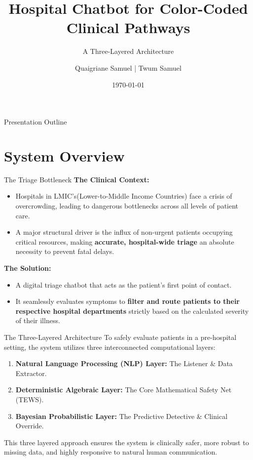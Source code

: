 \documentclass[11pt, aspectratio=169]{beamer}
\title[Hospital Chatbot for Clinical Pathways]{Hospital Chatbot for Color-Coded Clinical Pathways}
\subtitle{A Three-Layered Architecture}
\author{Quaigriane Samuel | Twum Samuel}
\date{\today}
\begin{document}
	
	\begin{frame}
		\titlepage
	\end{frame}
	
	\begin{frame}{Presentation Outline}
		\tableofcontents
	\end{frame}
	
\section{System Overview}
\begin{frame}{The Triage Bottleneck}
	\textbf{The Clinical Context:}
	\begin{itemize}
		\item Hospitals in LMIC's(Lower-to-Middle Income Countries) face a crisis of overcrowding, leading to dangerous bottlenecks across all levels of patient care.
		\item A major structural driver is the influx of non-urgent patients occupying critical resources, making \textbf{accurate, hospital-wide triage} an absolute necessity to prevent fatal delays.
	\end{itemize}
	\vspace{0.2cm}
	\textbf{The Solution:}
	\begin{itemize}
		\item A digital triage chatbot that acts as the patient's first point of contact. 
		\item It seamlessly evaluates symptoms to \textbf{filter and route patients to their respective hospital departments} strictly based on the calculated severity of their illness.
	\end{itemize}
\end{frame}
	
	\begin{frame}{The Three-Layered Architecture}
		To safely evaluate patients in a pre-hospital setting, the system utilizes three interconnected computational layers:
		\vspace{0.3cm}
		\begin{enumerate}
			\item \textbf{Natural Language Processing (NLP) Layer:} The Listener \& Data Extractor.
			\item \textbf{Deterministic Algebraic Layer:} The Core Mathematical Safety Net (TEWS).
			\item \textbf{Bayesian Probabilistic Layer:} The Predictive Detective \& Clinical Override.
		\end{enumerate}
		\vspace{0.3cm}
		This three layered approach ensures the system is clinically safer, more robust to missing data, and highly responsive to natural human communication.
	\end{frame}
	
\end{document}
